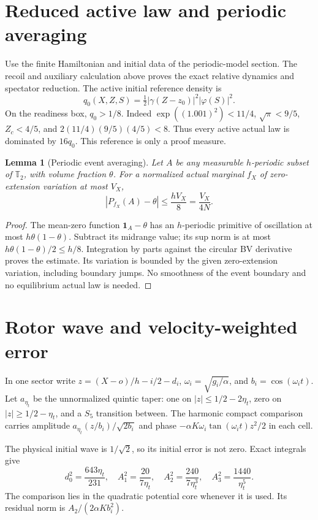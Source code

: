\documentclass[11pt]{article}
\newtheorem{lemma}[theorem]{Lemma}
\theoremstyle{definition}\newtheorem{definition}[theorem]{Definition}
\theoremstyle{remark}\newtheorem{remark}[theorem]{Remark}
\newcommand{\one}{\mathbf1}\newcommand{\R}{\mathbb R}\newcommand{\T}{\mathbb T}
\begin{document}
\section{Reduced active law and periodic averaging}
Use the finite Hamiltonian and initial data of the periodic-model section. The recoil and auxiliary calculation above proves the exact relative dynamics and spectator reduction. The active initial reference density is
\[
 q_0(X,Z,S)=\tfrac12|\gamma(Z-z_0)|^2|\varphi(S)|^2.
\]
On the readiness box, $q_0>1/8$. Indeed $\exp((1.001)^2)<11/4$, $\sqrt\pi<9/5$, $Z_c<4/5$, and $2(11/4)(9/5)(4/5)<8$. Thus every active actual law is dominated by $16q_0$. This reference is only a proof measure.

\begin{lemma}[Periodic event averaging]\label{ph:lem:avg}
Let $A$ be any measurable $h$-periodic subset of $\T_2$, with volume fraction $\theta$. For a normalized actual marginal $f_X$ of zero-extension variation at most $V_X$,
\[
 |P_{f_X}(A)-\theta|\le\frac{hV_X}{8}=\frac{V_X}{4N}.
\]
\end{lemma}
\begin{proof}
The mean-zero function $\one_A-\theta$ has an $h$-periodic primitive of oscillation at most $h\theta(1-\theta)$. Subtract its midrange value; its sup norm is at most $h\theta(1-\theta)/2\le h/8$. Integration by parts against the circular BV derivative proves the estimate. Its variation is bounded by the given zero-extension variation, including boundary jumps. No smoothness of the event boundary and no equilibrium actual law is needed.
\end{proof}

\section{Rotor wave and velocity-weighted error}
In one sector write $z=(X-o)/h-i/2-d_i$, $\omega_i=\sqrt{g_i/\alpha}$, and $b_i=\cos(\omega_i t)$. Let $a_{\eta_t}$ be the unnormalized quintic taper: one on $|z|\le1/2-2\eta_t$, zero on $|z|\ge1/2-\eta_t$, and a $S_5$ transition between. The harmonic compact comparison carries amplitude $a_{\eta_t}(z/b_i)/\sqrt{2b_i}$ and phase $-\alpha K\omega_i\tan(\omega_it)z^2/2$ in each cell.

The physical initial wave is $1/\sqrt2$, so its initial error is not zero. Exact integrals give
\[
 d_0^2=\frac{643\eta_t}{231},\quad
 A_1^2=\frac{20}{7\eta_t},\quad
 A_2^2=\frac{240}{7\eta_t^3},\quad
 A_3^2=\frac{1440}{\eta_t^5}.
\]
The comparison lies in the quadratic potential core whenever it is used. Its residual norm is $A_2/(2\alpha Kb_i^2)$.
\end{document}
